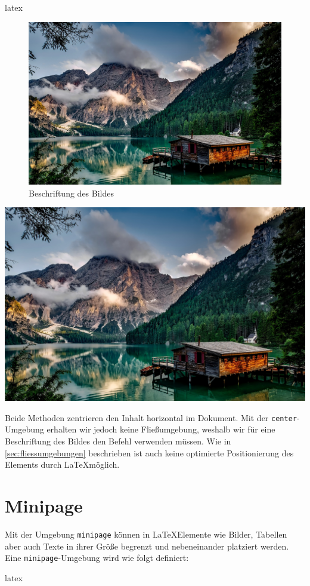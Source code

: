 \begin{showcase}
    \begin{code}{latex}
        \begin{figure}
            \centering
            \includegraphics[width=0.4\columnwidth]{assets/images/bilder/pexels-pixabay-147411.jpg}
            \caption{Beschriftung des Bildes}
        \end{figure}
    \end{code}
    \tcblower
    \begin{center}
        \includegraphics[width=0.4\columnwidth]{assets/images/bilder/pexels-pixabay-147411.jpg}
    \end{center}
\end{showcase}

Beide Methoden zentrieren den Inhalt horizontal im Dokument. Mit der \texttt{center}-Umgebung erhalten wir jedoch keine Fließumgebung, weshalb wir für eine Beschriftung des Bildes den Befehl \texttt{} verwenden müssen. Wie in \autoref{sec:fliessumgebungen} beschrieben ist auch keine optimierte Positionierung des Elements durch \LaTeX möglich.

\section{Minipage}
\label{sec:minipage}
Mit der Umgebung \texttt{minipage} können in \LaTeX Elemente wie Bilder, Tabellen aber auch Texte in ihrer Größe begrenzt und nebeneinander platziert werden. Eine \texttt{minipage}-Umgebung wird wie folgt definiert:

\begin{code}{latex}
    \begin{minipage}[outer position][height][inner pos]{width}
    \end{minipage}
\end{code}

